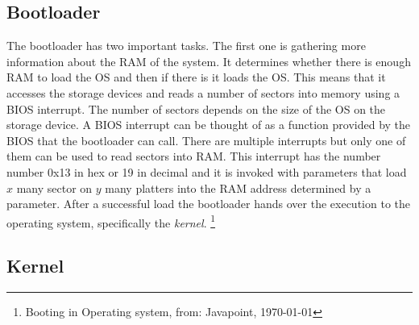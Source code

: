 \subsection{Bootloader}

The bootloader has two important tasks. The first one is gathering more
information about the RAM of the system. It determines whether there is
enough RAM to load the OS and then if there is it loads the OS. 
This means that it accesses the storage devices and reads a number of
sectors into memory using a BIOS interrupt. The number of sectors depends on
the size of the OS on the storage device. A BIOS interrupt can be thought of
as a function provided by the BIOS that the bootloader can call. There are
multiple interrupts but only one of them can be used to read sectors into
RAM. This interrupt has the number number 0x13 in hex or 19 in decimal and it is 
invoked with parameters that load $x$ many sector on $y$ many platters into the RAM
address determined by a parameter. After a successful load the bootloader
hands over the execution to the operating system, specifically the \textit{kernel}.
\footnote{Booting in Operating system, from: Javapoint, \today }

\subsection{Kernel}

